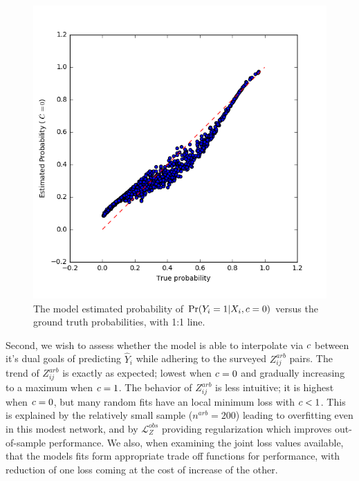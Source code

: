         \begin{figure}
            \centering
            \includegraphics{fig_softmono/synthetic_p_fit.png}
            \caption{The model estimated probability of $\Pr(Y_i = 1 | X_i, c = 0)$ versus the ground truth probabilities, with 1:1 line.}
            \label{fig:sm_synthetic_p_fit}
        \end{figure}
        
        Second, we wish to assess whether the model is able to interpolate via $c$ between it's dual goals of predicting $\hat{Y}_i$ while adhering to the surveyed $Z_{ij}^{arb}$ pairs.  The trend of $Z_{ij}^{arb}$ is exactly as expected; lowest when $c = 0$ and gradually increasing to a maximum when $c = 1$.  The behavior of $Z_{ij}^{arb}$ is less intuitive; it is highest when $c = 0$, but many random fits have an local minimum loss with $c < 1$.  This is explained by the relatively small sample ($n^{arb} = 200$) leading to overfitting even in this modest network, and by $\mathcal{L}_Z^{obs}$ providing regularization which improves out-of-sample performance.  We also, when examining the joint loss values available, that the models fits form appropriate trade off functions for performance, with reduction of one loss coming at the cost of increase of the other. 
        
